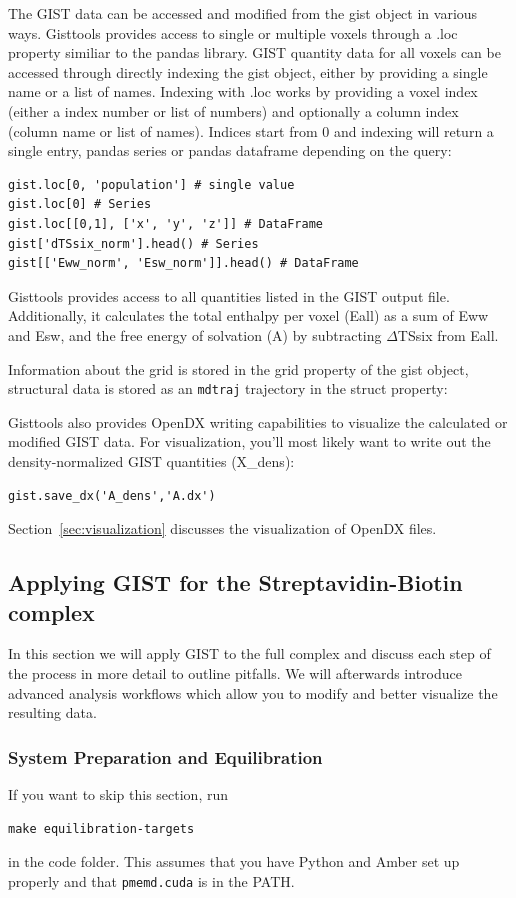 \documentclass[9pt,tutorial]{livecoms}
\newcommand{\software}{\texttt}
\begin{document}
The GIST data can be accessed and modified from the gist object in various ways.
Gisttools provides access to single or multiple voxels through a .loc property similiar to the pandas library. 
GIST quantity data for all voxels can be accessed through directly indexing the gist object, either by providing a single name or a list of names.
Indexing with .loc works by providing a voxel index (either a index number or list of numbers) and optionally a column index (column name or list of names). Indices start from 0 and indexing will return a single entry, pandas series or pandas dataframe depending on the query:
\begin{lstlisting}[style=python]
gist.loc[0, 'population'] # single value
gist.loc[0] # Series
gist.loc[[0,1], ['x', 'y', 'z']] # DataFrame
gist['dTSsix_norm'].head() # Series
gist[['Eww_norm', 'Esw_norm']].head() # DataFrame
\end{lstlisting}

Gisttools provides access to all quantities listed in the GIST output file.
Additionally, it calculates the total enthalpy per voxel (Eall) as a sum of Eww and Esw, and the free energy of solvation (A) by subtracting $\Delta$TSsix from Eall.

Information about the grid is stored in the grid property of the gist object, structural data is stored as an \software{mdtraj} trajectory in the struct property:

Gisttools also provides OpenDX writing capabilities to visualize the calculated or modified GIST data. For visualization, you'll most likely want to write out the density-normalized GIST quantities (X\_dens):

\begin{lstlisting}[style=python]
gist.save_dx('A_dens','A.dx')
\end{lstlisting}

Section~\ref{sec:visualization} discusses the visualization of OpenDX files.

\subsection{Applying GIST for the Streptavidin-Biotin complex}
In this section we will apply GIST to the full complex and discuss each step of the process in more detail to outline pitfalls. We will afterwards introduce advanced analysis workflows which allow you to modify and better visualize the resulting data.
\subsubsection{System Preparation and Equilibration}
If you want to skip this section, run 
\begin{lstlisting}[style=bash]
make equilibration-targets
\end{lstlisting}
in the code folder. This assumes that you have Python and Amber set up properly and that \software{pmemd.cuda} is in the PATH.
\end{document}
